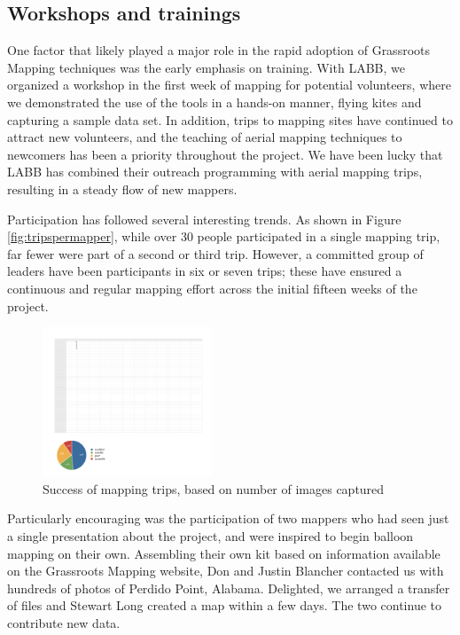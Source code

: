 \documentclass[11pt,oneside,notitlepage]{report}
\begin{document}
\subsection{Workshops and trainings}

One factor that likely played a major role in the rapid adoption of Grassroots Mapping techniques was the early emphasis on training. With \ac{LABB}, we organized a workshop in the first week of mapping for potential volunteers, where we demonstrated the use of the tools in a hands-on manner, flying kites and capturing a sample data set. In addition, trips to mapping sites have continued to attract new volunteers, and the teaching of aerial mapping techniques to newcomers has been a priority throughout the project. We have been lucky that \ac{LABB} has combined their outreach programming with aerial mapping trips, resulting in a steady flow of new mappers. 

Participation has followed several interesting trends. As shown in Figure \ref{fig:tripspermapper}, while over 30 people participated in a single mapping trip, far fewer were part of a second or third trip. However, a committed group of leaders have been participants in six or seven trips; these have ensured a continuous and regular mapping effort across the initial fifteen weeks of the project. 

\begin{figure}
	\begin{flushright}
		\includegraphics[width=0.45\textwidth]{diagrams/gulf-trip-success.pdf}
		\caption{Success of mapping trips, based on number of images captured}
	\end{flushright}
\end{figure}

Particularly encouraging was the participation of two mappers who had seen just a single presentation about the project, and were inspired to begin balloon mapping on their own. Assembling their own kit based on information available on the Grassroots Mapping website, Don and Justin Blancher contacted us with hundreds of photos of Perdido Point, Alabama. Delighted, we arranged a transfer of files and Stewart Long created a map within a few days. The two continue to contribute new data.  
 
\end{document}
